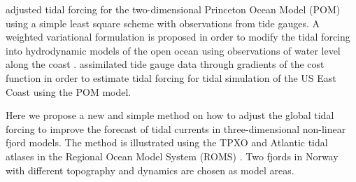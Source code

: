 \cite{chen99} adjusted tidal forcing for the two-dimensional Princeton Ocean Model (POM) using a simple least square scheme with observations from tide gauges. A weighted variational formulation is proposed in order to modify the tidal forcing into hydrodynamic models of the open ocean using observations of water level along the coast \cite[]{bennett82}. \cite[]{zhang03} assimilated tide gauge data through gradients of the cost function in order to estimate tidal forcing for tidal simulation of the US East Coast using the POM model. 

Here we propose a new and simple method on how to adjust the global tidal forcing to improve the forecast of tidal currents in three-dimensional non-linear fjord models. The method is illustrated using the TPXO and Atlantic tidal atlases \cite[]{egbert94,egbert02} in the Regional Ocean Model System (ROMS) \cite[]{shchepetkin05,shchepetkin09,haidvogel08}. Two fjords in Norway with different topography and dynamics are chosen as model areas. 
